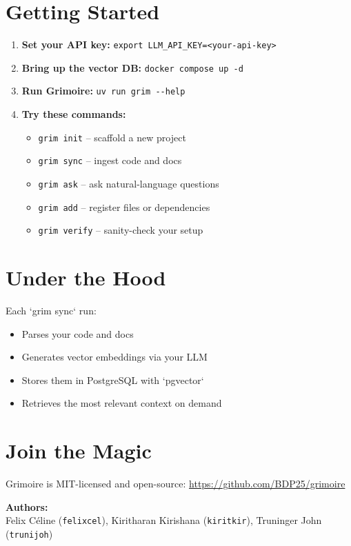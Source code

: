 \documentclass{article}
\begin{document}
\section*{\color{grimPink}Getting Started}
\begin{enumerate}[leftmargin=*]
  \item \textbf{Set your API key:}  
    \verb|export LLM_API_KEY=<your-api-key>|
  \item \textbf{Bring up the vector DB:}  
    \verb|docker compose up -d|
  \item \textbf{Run Grimoire:}  
    \verb|uv run grim --help|
  \item \textbf{Try these commands:}
    \begin{itemize}[leftmargin=1.5em]
      \item \verb|grim init|    – scaffold a new project  
      \item \verb|grim sync|    – ingest code and docs  
      \item \verb|grim ask|     – ask natural-language questions  
      \item \verb|grim add|     – register files or dependencies  
      \item \verb|grim verify|  – sanity-check your setup  
    \end{itemize}
\end{enumerate}

\section*{\color{grimPink}Under the Hood}
Each `grim sync` run:

\begin{itemize}[leftmargin=*]
  \item Parses your code and docs  
  \item Generates vector embeddings via your LLM  
  \item Stores them in PostgreSQL with `pgvector`  
  \item Retrieves the most relevant context on demand  
\end{itemize}

\section*{\color{grimPink}Join the Magic}
Grimoire is MIT-licensed and open-source:  
\url{https://github.com/BDP25/grimoire}

\vspace{1em}
\noindent\textbf{Authors:}\\
Felix Céline (\texttt{felixcel}),  
Kiritharan Kirishana (\texttt{kiritkir}),  
Truninger John (\texttt{trunijoh})
\end{document}
